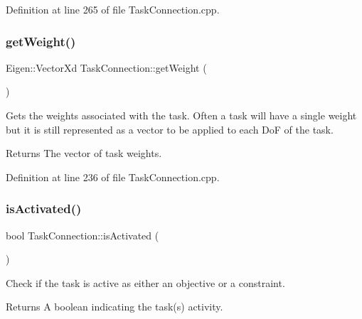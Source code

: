 Definition at line 265 of file Task\+Connection.\+cpp.

\hypertarget{classocra__recipes_1_1TaskConnection_a44930029ade716c0ebbe04fba658cf7e}{}\label{classocra__recipes_1_1TaskConnection_a44930029ade716c0ebbe04fba658cf7e} 
\subsubsection{\texorpdfstring{get\+Weight()}{getWeight()}}
{\footnotesize\ttfamily Eigen\+::\+Vector\+Xd Task\+Connection\+::get\+Weight (\begin{DoxyParamCaption}{ }\end{DoxyParamCaption})}

Gets the weights associated with the task. Often a task will have a single weight but it is still represented as a vector to be applied to each DoF of the task.

\begin{DoxyReturn}{Returns}
The vector of task weights. 
\end{DoxyReturn}


Definition at line 236 of file Task\+Connection.\+cpp.

\hypertarget{classocra__recipes_1_1TaskConnection_a07179a0e687fd28d091eeebb1157fac0}{}\label{classocra__recipes_1_1TaskConnection_a07179a0e687fd28d091eeebb1157fac0} 
\subsubsection{\texorpdfstring{is\+Activated()}{isActivated()}}
{\footnotesize\ttfamily bool Task\+Connection\+::is\+Activated (\begin{DoxyParamCaption}{ }\end{DoxyParamCaption})}

Check if the task is active as either an objective or a constraint.

\begin{DoxyReturn}{Returns}
A boolean indicating the task(s) activity. 
\end{DoxyReturn}


